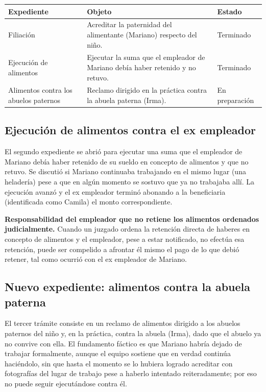 \documentclass[12pt,oneside]{book}
\begin{document}
\begin{table}[H]
\centering
\begin{tabularx}{\textwidth}{>{\raggedright\arraybackslash}p{} >{\raggedright\arraybackslash}X >{\raggedright\arraybackslash}p{}}
\toprule
\textbf{Expediente} & \textbf{Objeto} & \textbf{Estado} \\
\midrule
Filiación & Acreditar la paternidad del alimentante (Mariano) respecto del niño. & Terminado \\
Ejecución de alimentos & Ejecutar la suma que el empleador de Mariano debía haber retenido y no retuvo. & Terminado \\
Alimentos contra los abuelos paternos & Reclamo dirigido en la práctica contra la abuela paterna (Irma). & En preparación \\
\bottomrule
\end{tabularx}
\end{table}

\subsection{Ejecución de alimentos contra el ex empleador}

El segundo expediente se abrió para ejecutar una suma que el empleador de Mariano debía haber retenido de su sueldo en concepto de alimentos y que no retuvo. Se discutió si Mariano continuaba trabajando en el mismo lugar (una heladería) pese a que en algún momento se sostuvo que ya no trabajaba allí. La ejecución avanzó y el ex empleador terminó abonando a la beneficiaria (identificada como Camila) el monto correspondiente.

\begin{important}
\textbf{Responsabilidad del empleador que no retiene los alimentos ordenados judicialmente.} Cuando un juzgado ordena la retención directa de haberes en concepto de alimentos y el empleador, pese a estar notificado, no efectúa esa retención, puede ser compelido a afrontar él mismo el pago de lo que debió retener, tal como ocurrió con el ex empleador de Mariano.
\end{important}

\subsection{Nuevo expediente: alimentos contra la abuela paterna}

El tercer trámite consiste en un reclamo de alimentos dirigido a los abuelos paternos del niño y, en la práctica, contra la abuela (Irma), dado que el abuelo ya no convive con ella. El fundamento fáctico es que Mariano habría dejado de trabajar formalmente, aunque el equipo sostiene que en verdad continúa haciéndolo, sin que hasta el momento se lo hubiera logrado acreditar con fotografías del lugar de trabajo pese a haberlo intentado reiteradamente; por eso no puede seguir ejecutándose contra él.
\end{document}
